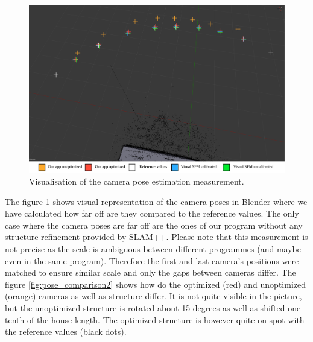 \begin{figure}[!htbp]
	\begin{center}
		\includegraphics[keepaspectratio,width=\textwidth]{fig/pose_comparison.pdf}
	\end{center}
	\caption{Visualisation of the camera pose estimation measurement.}
	\label{fig:pose_comparison1}
\end{figure} 

The figure \ref{fig:pose_comparison1} shows visual representation of the camera poses in Blender where we have calculated how far off are they compared to the reference values. The only case where the camera poses are far off are the ones of our program without any structure refinement provided by SLAM++. Please note that this measurement is not precise as the scale is ambiguous between different programmes (and maybe even in the same program). Therefore the first and last camera's positions were matched to ensure similar scale and only the gaps between cameras differ. The figure \ref{fig:pose_comparison2} shows how do the optimized (red) and unoptimized (orange) cameras as well as structure differ. It is not quite visible in the picture, but the unoptimized structure is rotated about 15 degrees as well as shifted one tenth of the house length. The optimized structure is however quite on spot with the reference values (black dots).


